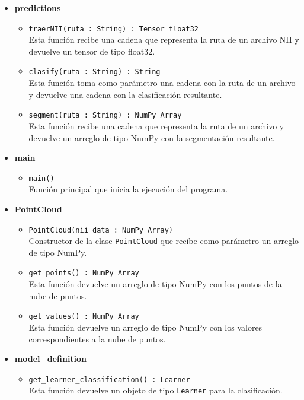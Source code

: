 \begin{itemize}
	\item \textbf{predictions}
	\begin{itemize}
		\item \texttt{traerNII(ruta : String) : Tensor float32} \\
		Esta función recibe una cadena que representa la ruta de un archivo NII y devuelve un tensor de tipo float32.
		
		\item \texttt{clasify(ruta : String) : String} \\
		Esta función toma como parámetro una cadena con la ruta de un archivo y devuelve una cadena con la clasificación resultante.
		
		\item \texttt{segment(ruta : String) : NumPy Array} \\
		Esta función recibe una cadena que representa la ruta de un archivo y devuelve un arreglo de tipo NumPy con la segmentación resultante.
	\end{itemize}
	
	\item \textbf{main}
	\begin{itemize}
		\item \texttt{main()} \\
		Función principal que inicia la ejecución del programa.
	\end{itemize}
	
	\item \textbf{PointCloud}
	\begin{itemize}
		\item \texttt{PointCloud(nii\_data : NumPy Array)} \\
		Constructor de la clase \texttt{PointCloud} que recibe como parámetro un arreglo de tipo NumPy.
		
		\item \texttt{get\_points() : NumPy Array} \\
		Esta función devuelve un arreglo de tipo NumPy con los puntos de la nube de puntos.
		
		\item \texttt{get\_values() : NumPy Array} \\
		Esta función devuelve un arreglo de tipo NumPy con los valores correspondientes a la nube de puntos.
	\end{itemize}
	
	\item \textbf{model\_definition}
	\begin{itemize}
		\item \texttt{get\_learner\_classification() : Learner} \\
		Esta función devuelve un objeto de tipo \texttt{Learner} para la clasificación.
		

\end{itemize}
\end{itemize}
